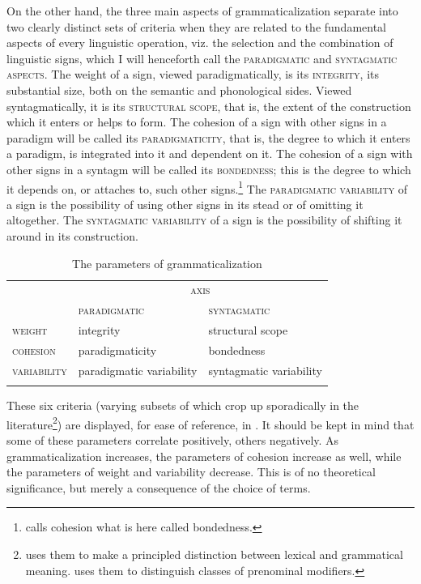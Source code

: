 On the other hand, the three main aspects of grammaticalization separate into two clearly distinct sets of criteria when they are related to the fundamental aspects of every linguistic operation, viz. the selection and the combination of linguistic signs, which I will henceforth call the \textsc{paradigmatic} and \textsc{syntagmatic aspects}. The weight of a sign, viewed paradigmatically, is its \textsc{integrity}, its substantial size, both on the semantic and phonological sides. Viewed syntagmatically, it is its \textsc{structural scope}, that is, the extent of the construction which it enters or helps to form. The cohesion of a sign with other signs in a paradigm will be called its \textsc{paradigmaticity}, that is, the degree to which it enters a paradigm, is integrated into it and dependent on it. The cohesion of a sign with other signs in a syntagm will be called its \textsc{bondedness}; this is the degree to which it depends on, or attaches to, such other signs.\footnote{\citet[8]{Bazell1949} calls cohesion what is here called bondedness.} The \textsc{paradigmatic variability} of a sign is the possibility of using other signs in its stead or of omitting it altogether. The \textsc{syntagmatic variability} of a sign is the possibility of shifting it around in its construction.

\begin{table}
\begin{tabular}{lll}
\lsptoprule
 \multirow{2}{*}{\scshape paramater} & \multicolumn{2}{c}{\scshape axis}\\ \cmidrule{2-3}
 
& \scshape paradigmatic & \scshape syntagmatic\\
\midrule
\scshape weight & integrity & structural scope\\
\scshape cohesion & paradigmaticity & bondedness\\
\scshape variability & paradigmatic variability & syntagmatic variability\\
\lspbottomrule
\end{tabular}
\caption{The parameters of grammaticalization}\label{T4}
\end{table}

\newpage
These six criteria (varying subsets of which crop up sporadically in the literature\footnote{\citet[169]{Weinreich1963} uses them to make a principled distinction between lexical and grammatical meaning. \citet[Ch. I]{VanRoey1974} uses them to distinguish classes of prenominal modifiers.}) are displayed, for ease of reference, in . It should be kept in mind that some of these parameters correlate positively, others negatively. As grammaticalization increases, the parameters of cohesion increase as well, while the parameters of weight and variability decrease. This is of no theoretical significance, but merely a consequence of the choice of terms.

